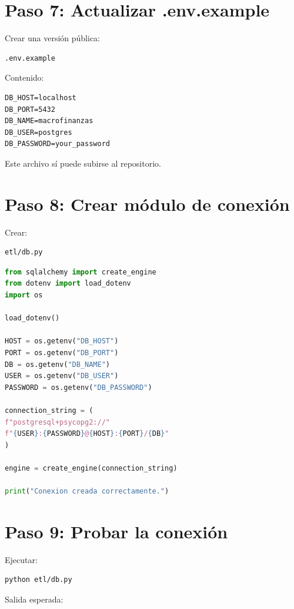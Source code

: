 \section{Paso 7: Actualizar .env.example}

Crear una versión pública:

\begin{verbatim}
.env.example
\end{verbatim}

Contenido:

\begin{lstlisting}
DB_HOST=localhost
DB_PORT=5432
DB_NAME=macrofinanzas
DB_USER=postgres
DB_PASSWORD=your_password
\end{lstlisting}

Este archivo sí puede subirse al repositorio.

\section{Paso 8: Crear módulo de conexión}

Crear:

\begin{verbatim}
etl/db.py
\end{verbatim}

\begin{lstlisting}[language=Python]
from sqlalchemy import create_engine
from dotenv import load_dotenv
import os

load_dotenv()

HOST = os.getenv("DB_HOST")
PORT = os.getenv("DB_PORT")
DB = os.getenv("DB_NAME")
USER = os.getenv("DB_USER")
PASSWORD = os.getenv("DB_PASSWORD")

connection_string = (
f"postgresql+psycopg2://"
f"{USER}:{PASSWORD}@{HOST}:{PORT}/{DB}"
)

engine = create_engine(connection_string)

print("Conexion creada correctamente.")
\end{lstlisting}

\section{Paso 9: Probar la conexión}

Ejecutar:

\begin{lstlisting}[language=bash]
python etl/db.py
\end{lstlisting}

Salida esperada:

